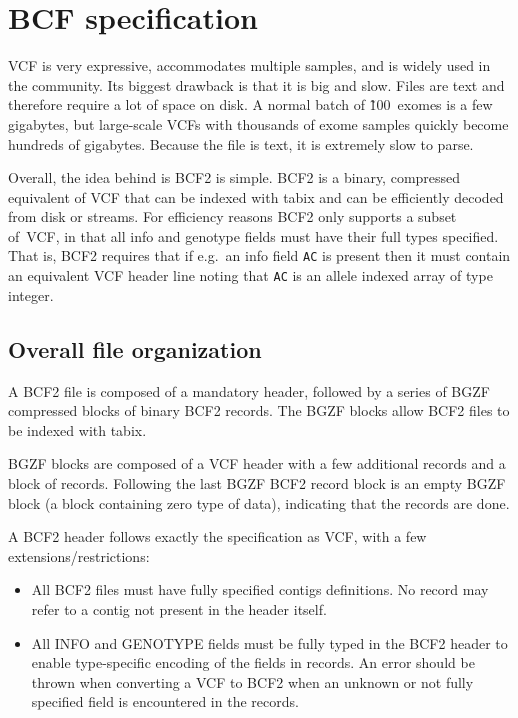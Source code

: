 \documentclass[8pt]{article}
\begin{document}
\pagebreak
\section{BCF specification}

VCF is very expressive, accommodates multiple samples, and is widely used
in the community.  Its biggest drawback is that it is big and slow.
Files are text and therefore require a lot of space on disk.  A normal batch
of \~100~exomes is a few gigabytes, but large-scale VCFs with thousands of exome
samples quickly become hundreds of gigabytes.  Because the file is text, it is
extremely slow to parse.

Overall, the idea behind is BCF2 is simple.  BCF2 is a binary, compressed
equivalent of VCF that can be indexed with tabix and can be efficiently decoded
from disk or streams.  For efficiency reasons BCF2 only supports a subset
of~VCF, in that all info and genotype fields must have their full types
specified.  That is, BCF2 requires that if e.g.\ an info field {\tt AC} is
present then it must contain an equivalent VCF header line noting that {\tt AC}
is an allele indexed array of type integer.

\subsection{Overall file organization}

A BCF2 file is composed of a mandatory header, followed by a series of BGZF
compressed blocks of binary BCF2 records.  The BGZF blocks allow BCF2 files
to be indexed with tabix.

BGZF blocks are composed of a VCF header with a few additional records and a
block of records.  Following the last BGZF BCF2 record block is an empty
BGZF block (a block containing zero type of data), indicating that the
records are done.

A BCF2 header follows exactly the specification as VCF, with a few
extensions/restrictions:
\begin{itemize}
\item All BCF2 files must have fully specified contigs definitions.
No record may refer to a contig not present in the header itself.

\item All INFO and GENOTYPE fields must be fully typed in the BCF2 header to
enable type-specific encoding of the fields in records.  An error should be
thrown when converting a VCF to BCF2 when an unknown or not fully specified
field is encountered in the records.
\end{itemize}
\end{document}

